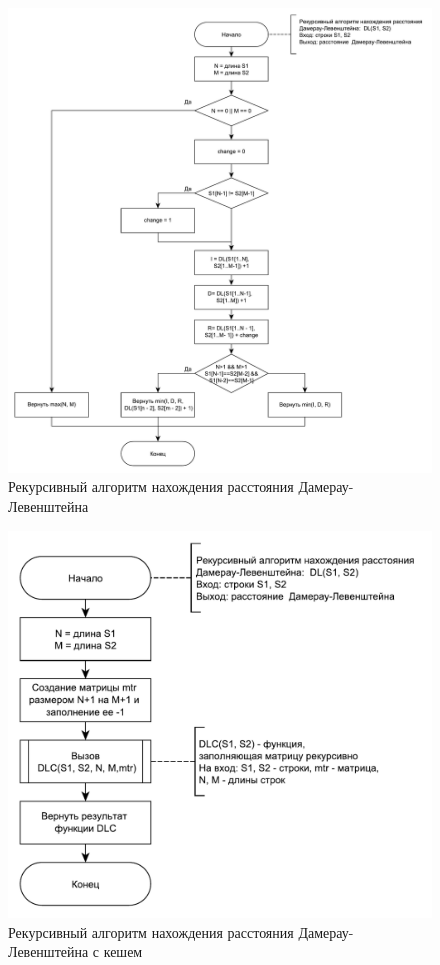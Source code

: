 \begin{figure}
	\centering
	\includegraphics[width=1\textwidth]{img/DLrec.pdf} %
	\caption{Рекурсивный алгоритм нахождения расстояния Дамерау-Левенштейна}
	\label{fig:DLrec}
\end{figure}

\begin{figure}
	\centering
	\includegraphics[width=1\textwidth]{img/DLrecCash.pdf} %
	\caption{Рекурсивный алгоритм нахождения расстояния Дамерау-Левенштейна с кешем}
	\label{fig:DLrecCash}
\end{figure}


